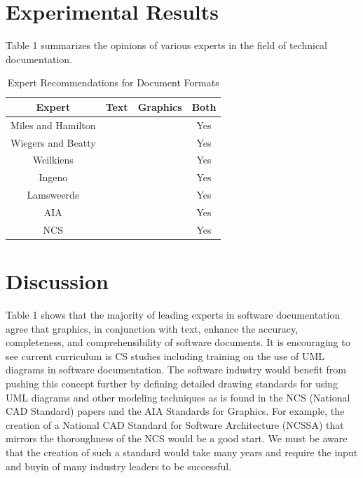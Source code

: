 \documentclass{acm_proc_article-sp}
\begin{document}
\section{Experimental Results}
Table 1 summarizes the opinions of various experts in the field of technical documentation.
\begin{table}[ht]
	\caption{Expert Recommendations for Document Formats} %
	\centering %
	\begin{tabular}{c c c c} %
		\hline\hline %
		Expert & Text & Graphics & Both \\ [0.5ex] %
		\hline %
		Miles and Hamilton \cite{Lamport:UML} &  &  & Yes \\ %
		Wiegers and Beatty \cite{Lamport:SoftwareRequirements} &  &  & Yes \\
		Weilkiens \cite{Lamport:SysML} &  &  & Yes \\
		Ingeno \cite{Lamport:SoftwareArchitectureHandbook} &  &  & Yes \\
		Lamsweerde \cite{Lamport:RequirementsEngineering} &  &  & Yes \\
		AIA \cite{Lamport:AIA_Graphical_Standards} &  &  & Yes \\
		NCS \cite{Lamport:NCS} &  &  & Yes \\ [1ex] %
		\hline %
	\end{tabular}
	\label{table:nonlin} %
\end{table}

\section{Discussion}
Table 1 shows that the majority of leading experts in software documentation agree that graphics, in conjunction with text, enhance the accuracy, completeness, and comprehensibility of software documents. It is encouraging to see current curriculum is CS studies including training on the use of UML diagrams in software documentation. The software industry would benefit from pushing this concept further by defining detailed drawing standards for using UML diagrams and other modeling techniques as is found in the NCS (National CAD Standard) papers and the AIA Standards for Graphics. For example, the creation of a National CAD Standard for Software Architecture (NCSSA) that mirrors the thoroughness of the NCS would be a good start. We must be aware that the creation of such a standard would take many years and require the input and buyin of many industry leaders to be successful.
\end{document}
